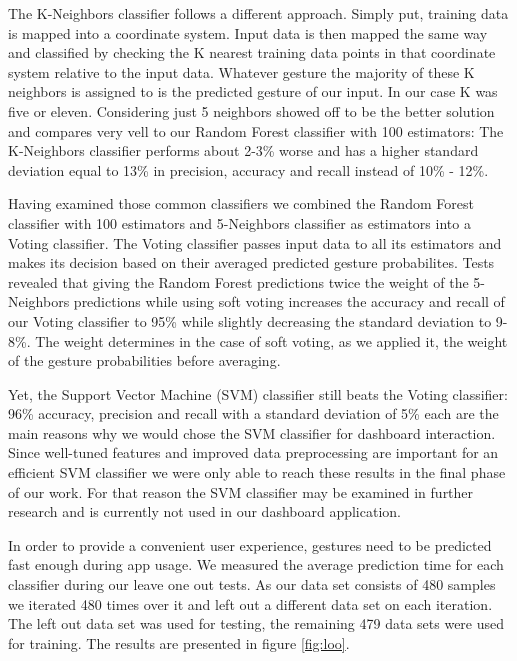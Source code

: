 The K-Neighbors classifier follows a different approach. Simply put, training data is mapped into a coordinate system. Input data is then mapped the same way and classified by checking the K nearest training data points in that coordinate system relative to the input data. Whatever gesture the majority of these K neighbors is assigned to is the predicted gesture of our input. In our case K was five or eleven. Considering just 5 neighbors showed off to be the better solution and compares very vell to our Random Forest classifier with 100 estimators: The K-Neighbors classifier performs about 2-3\% worse and has a higher standard deviation equal to 13\% in precision, accuracy and recall instead of 10\% - 12\%.

Having examined those common classifiers we combined the Random Forest classifier with 100 estimators and 5-Neighbors classifier as estimators into a Voting classifier. The Voting classifier passes input data to all its estimators and makes its decision based on their averaged predicted gesture probabilites. Tests revealed that giving the Random Forest predictions twice the weight of the 5-Neighbors predictions while using soft voting increases the accuracy and recall of our Voting classifier to 95\% while slightly decreasing the standard deviation to 9-8\%. The weight determines in the case of soft voting, as we applied it, the weight of the gesture probabilities before averaging.

Yet, the Support Vector Machine (SVM) classifier still beats the Voting classifier: 96\% accuracy, precision and recall with a standard deviation of 5\% each are the main reasons why we would chose the SVM classifier for dashboard interaction. Since well-tuned features and improved data preprocessing are important for an efficient SVM classifier we were only able to reach these results in the final phase of our work. For that reason the SVM classifier may be examined in further research and is currently not used in our dashboard application.

In order to provide a convenient user experience, gestures need to be predicted fast enough during app usage. We measured the average prediction time for each classifier during our leave one out tests. As our data set consists of 480 samples we iterated 480 times over it and left out a different data set on each iteration. The left out data set was used for testing, the remaining 479 data sets were used for training. The results are presented in figure \ref{fig:loo}.

